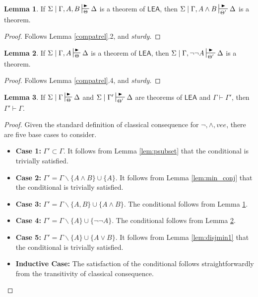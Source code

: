 \documentclass{article}
\theoremstyle{definition}
\theoremstyle{definition}
\theoremstyle{definition}
\newtheorem{lemma}{Lemma}
\theoremstyle{definition}
\theoremstyle{remark}
\theoremstyle{definition}
\theoremstyle{definition}
\begin{document}
\begin{lemma}\label{lem:wedgemin}
	If $ \Sigma\mid\Gamma, A, B\sststile{\Theta}{\RHD}\Delta $ is a theorem of $ \mathsf{LEA}$, then $ \Sigma\mid\Gamma, A\wedge B\sststile{\Theta'}{\RHD}\Delta $  is a theorem.
	\begin{proof}
		Follows Lemma \ref{compatrel}.2, and \textit{sturdy}.
	\end{proof}
\end{lemma}

\begin{lemma}\label{lem:negmin}
	If $ \Sigma\mid\Gamma, A\sststile{\Theta}{\RHD}\Delta $ is a theorem of $ \mathsf{LEA}$, then $ \Sigma\mid\Gamma, \neg\neg A\sststile{\Theta'}{\RHD}\Delta $  is a theorem.
	\begin{proof}
		Follows Lemma \ref{compatrel}.4, and \textit{sturdy}.
	\end{proof}
\end{lemma}

\begin{lemma}\label{lem:minimality}
		If $ \Sigma\mid\Gamma\sststile{\Theta}{\RHD}\Delta $ and $ \Sigma\mid\Gamma'\sststile{\Theta'}{\RHD}\Delta $ are theorems of $ \mathsf{LEA}$ and $\Gamma \vdash \Gamma' $, then $ \Gamma' \vdash \Gamma $.
		\begin{proof}
			Given the standard definition of classical consequence for $ \neg, \wedge, vee $, there are five base cases to consider. 
			\begin{itemize}
				\item[]\textbf{Case 1:} $ \Gamma' \subset \Gamma $.  It follows from  Lemma \ref{lem:psubset} that the conditional is trivially satisfied.
				\item[]\textbf{Case 2:} $ \Gamma'=\Gamma\backslash \{A\wedge B\}\cup\{A\} $. It follows from  Lemma \ref{lem:min_conj} that the conditional is trivially satisfied.
				\item[]\textbf{Case 3:} $ \Gamma'=\Gamma\backslash \{A, B\}\cup\{A\wedge B\} $. The conditional follows from Lemma \ref{lem:wedgemin}.
				\item[]\textbf{Case 4:} $ \Gamma'=\Gamma\backslash \{A\}\cup\{\neg\neg A\}  $. The conditional follows from Lemma \ref{lem:negmin}.
				\item[]\textbf{Case 5:} $ \Gamma'=\Gamma\backslash\{A\}\cup\{A\vee B\} $. It follows from  Lemma \ref{lem:disjmin1} that the conditional is trivially satisfied.
				\item[]\textbf{Inductive Case:} The satisfaction of the conditional follows straightforwardly from the transitivity of classical consequence. 
			\end{itemize}
		\end{proof}
\end{lemma}
\end{document}
